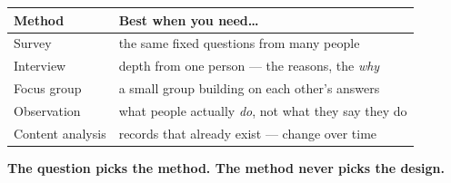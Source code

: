 \documentclass[aspectratio=169, 11pt]{beamer}
\begin{document}
\begin{frame}[t, plain]
  \vspace{2pt}
  \begin{center}
    \small
    \renewcommand{\arraystretch}{1.3}
    \begin{tabular}{@{} l l @{}}
    \hline
    \textbf{Method} & \textbf{Best when you need\ldots} \\
    \hline
    Survey           & the same fixed questions from many people \\
    Interview        & depth from one person --- the reasons, the \emph{why} \\
    Focus group      & a small group building on each other's answers \\
    Observation      & what people actually \emph{do}, not what they say they do \\
    Content analysis & records that already exist --- change over time \\
    \hline
    \end{tabular}
  \end{center}
  \vspace{8pt}
  \begin{center}
    {\color{cerulean}\bfseries The question picks the method. The method never picks the
    design.}
  \end{center}
\end{frame}
\end{document}
